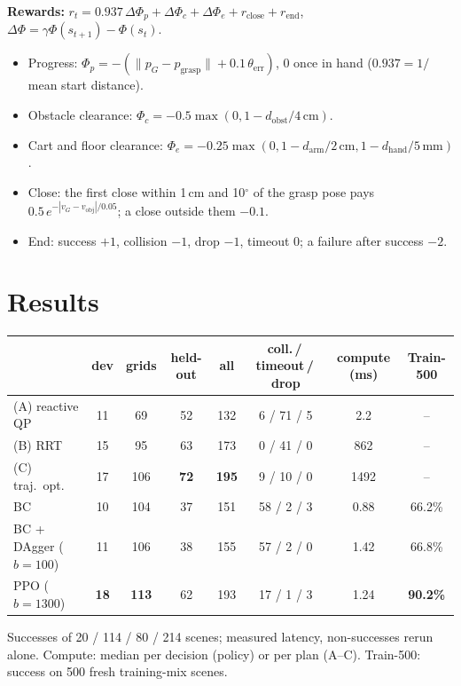 \documentclass[11pt]{article}
\begin{document}
\textbf{Rewards:} $r_t=0.937\,\Delta\Phi_p+\Delta\Phi_c+\Delta\Phi_e+r_{\text{close}}+r_{\text{end}}$,
$\Delta\Phi=\gamma\Phi(s_{t+1})-\Phi(s_t)$.
\begin{itemize}
  \item Progress: $\Phi_p=-(\lVert p_G-p_{\text{grasp}}\rVert+0.1\,\theta_{\text{err}})$, 0 once in hand
    ($0.937=1/$mean start distance).
  \item Obstacle clearance: $\Phi_c=-0.5\max(0,1-d_{\text{obst}}/4\,\text{cm})$.
  \item Cart and floor clearance: $\Phi_e=-0.25\max(0,1-d_{\text{arm}}/2\,\text{cm},1-d_{\text{hand}}/5\,\text{mm})$.
  \item Close: the first close within 1\,cm and 10$^\circ$ of the grasp pose pays $0.5\,e^{-|v_G-v_{\text{obj}}|/0.05}$;
    a close outside them $-0.1$.
  \item End: success $+1$, collision $-1$, drop $-1$, timeout 0; a failure after success $-2$.
\end{itemize}

\section{Results}

\begin{center}
{\setlength{\tabcolsep}{5pt}\begin{tabular}{@{}lccccccc@{}}
  \toprule
  & dev & grids & held-out & all & coll.\,/\,timeout\,/\,drop & compute (ms) & Train-500 \\
  \midrule
  (A) reactive QP     & 11 & 69  & 52 & 132 & 6 / 71 / 5  & 2.2  & -- \\
  (B) RRT             & 15 & 95  & 63 & 173 & 0 / 41 / 0  & 862  & -- \\
  (C) traj.\ opt.     & 17 & 106 & \textbf{72} & \textbf{195} & 9 / 10 / 0  & 1492 & -- \\
  \midrule
  BC                  & 10 & 104 & 37 & 151 & 58 / 2 / 3  & 0.88 & 66.2\% \\
  BC + DAgger ($b=100$) & 11 & 106 & 38 & 155 & 57 / 2 / 0 & 1.42 & 66.8\% \\
  PPO ($b=1300$)      & \textbf{18} & \textbf{113} & 62 & 193 & 17 / 1 / 3 & 1.24 & \textbf{90.2\%} \\
  \bottomrule
\end{tabular}}

\smallskip
{\small Successes of 20 / 114 / 80 / 214 scenes; measured latency, non-successes rerun alone. Compute: median per
decision (policy) or per plan (A--C). Train-500: success on 500 fresh training-mix scenes.}
\end{center}
\end{document}
